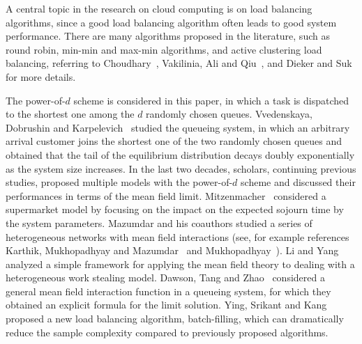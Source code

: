 \documentclass[12pt]{article}
\begin{document}
A central topic in the research on cloud computing is on load balancing algorithms, since a good load balancing algorithm often leads to good system performance.
There are many algorithms proposed in the literature, such as round robin, min-min and max-min algorithms, and active clustering load balancing, referring to Choudhary~\cite{MC}, Vakilinia, Ali and Qiu~\cite{VAQ}, and Dieker and Suk~\cite{DS} for more details.

 The power-of-$d$ scheme is considered in this paper, in which a task is dispatched to the shortest one among the $d$ randomly chosen queues. Vvedenskaya, Dobrushin and Karpelevich~\cite{VD} studied the queueing system, in which an arbitrary arrival customer joins the shortest one of the two randomly chosen queues and obtained that the tail of the equilibrium distribution decays doubly exponentially as the system size increases. In the last two decades, scholars, continuing previous studies, proposed multiple models with the power-of-$d$ scheme and discussed their performances in terms of the mean field limit.  Mitzenmacher~\cite{MM} considered a supermarket model by focusing on the impact on the expected sojourn time by the system parameters. Mazumdar and his coauthors studied a series of heterogeneous networks with mean field interactions (see, for example references Karthik, Mukhopadhyay and Mazumdar~\cite{KMM} and Mukhopadhyay~\cite{AM}). Li and Yang~\cite{Li} analyzed a simple framework for applying the mean field theory to dealing with a heterogeneous work stealing model. Dawson, Tang and Zhao~\cite{zhao} considered a general mean field interaction function in a queueing system, for which they obtained an explicit formula for the limit solution. Ying, Srikant and Kang~\cite{YSK} proposed a new load balancing algorithm, batch-filling, which can dramatically reduce the sample complexity compared to previously proposed algorithms.
\end{document}
